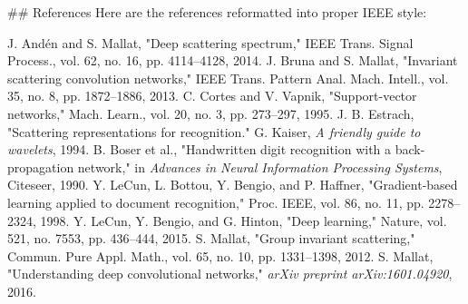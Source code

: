 \documentclass{article}
\begin{document}
\#\# References
Here are the references reformatted into proper IEEE style:

\cite{1} J. Andén and S. Mallat, "Deep scattering spectrum," IEEE Trans. Signal Process., vol. 62, no. 16, pp. 4114–4128, 2014.
\cite{2} J. Bruna and S. Mallat, "Invariant scattering convolution networks," IEEE Trans. Pattern Anal. Mach. Intell., vol. 35, no. 8, pp. 1872–1886, 2013.
\cite{3} C. Cortes and V. Vapnik, "Support-vector networks," Mach. Learn., vol. 20, no. 3, pp. 273–297, 1995.
\cite{4} J. B. Estrach, "Scattering representations for recognition."
\cite{5} G. Kaiser, \textit{A friendly guide to wavelets}, 1994.
\cite{6} B. Boser et al., "Handwritten digit recognition with a back-propagation network," in \textit{Advances in Neural Information Processing Systems}, Citeseer, 1990.
\cite{7} Y. LeCun, L. Bottou, Y. Bengio, and P. Haffner, "Gradient-based learning applied to document recognition," Proc. IEEE, vol. 86, no. 11, pp. 2278–2324, 1998.
\cite{8} Y. LeCun, Y. Bengio, and G. Hinton, "Deep learning," Nature, vol. 521, no. 7553, pp. 436–444, 2015.
\cite{9} S. Mallat, "Group invariant scattering," Commun. Pure Appl. Math., vol. 65, no. 10, pp. 1331–1398, 2012.
\cite{10} S. Mallat, "Understanding deep convolutional networks," \textit{arXiv preprint arXiv:1601.04920}, 2016.
\end{document}
